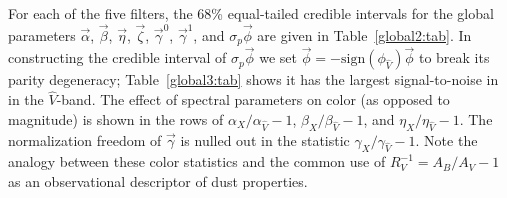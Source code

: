 \documentclass[trackchanges]{aastex61}   	%
\begin{document}
{For each of the five filters, the 68\%  equal-tailed credible intervals for the global parameters $\vec{\alpha}$, $\vec{\beta}$, $\vec{\eta}$, $\vec{\zeta}$,
$\vec{\gamma}^0$, $\vec{\gamma}^1$, and $\sigma_p\vec{\phi}$
are given in Table~\ref{global2:tab}.
In constructing the credible interval of $\sigma_p\vec{\phi}$ 
we set $\vec{\phi} = -\text{sign}(\phi_{\hat{V}}) \vec{\phi}$ to break its parity degeneracy;
Table~\ref{global3:tab} shows it has the largest signal-to-noise in
in the $\hat{V}$-band.
The effect of spectral parameters on color (as opposed to magnitude)
is shown in the rows of $\alpha_X/\alpha_{\hat{V}}-1$,  $\beta_X/\beta_{\hat{V}}-1$, and  $\eta_X/\eta_{\hat{V}}-1$.
The normalization freedom of $\vec{\gamma}$ is nulled out in the statistic
 $\gamma_X/\gamma_{\hat{V}}-1$.
Note the analogy between these color statistics and the common use of
$R_V^{-1}=A_B/A_V-1$ as an observational descriptor of dust properties.

}
\end{document}
